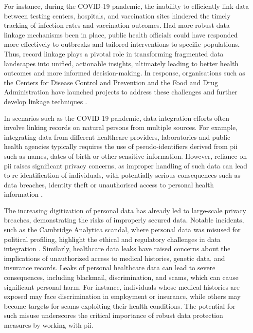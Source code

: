 For instance, during the COVID-19 pandemic, the inability to efficiently link data between testing centers, hospitals, and vaccination sites hindered the timely tracking of infection rates and vaccination outcomes. 
Had more robust data linkage mechanisms been in place, public health officials could have responded more effectively to outbreaks and tailored interventions to specific populations. 
Thus, record linkage plays a pivotal role in transforming fragmented data landscapes into unified, actionable insights, ultimately leading to better health outcomes and more informed decision-making.
In response, organisations such as the Centers for Disease Control and Prevention and the Food and Drug Administration have launched projects to address these challenges and further develop linkage techniques \cite{pathak2024privacy}.

In scenarios such as the COVID-19 pandemic, data integration efforts often involve linking records on natural persons from multiple sources.
For example, integrating data from different healthcare providers, laboratories and public health agencies typically requires the use of pseudo-identifiers derived from \ac{pii} such as names, dates of birth or other sensitive information. 
However, reliance on \ac{pii} raises significant privacy concerns, as improper handling of such data can lead to re-identification of individuals, with potentially serious consequences such as data breaches, identity theft or unauthorised access to personal health information \cite{pathak2024privacy}.

The increasing digitization of personal data has already led to large-scale privacy breaches, demonstrating the risks of improperly secured data. 
Notable incidents, such as the Cambridge Analytica scandal, where personal data was misused for political profiling, highlight the ethical and regulatory challenges in data integration \cite{isaak2018user}. 
Similarly, healthcare data leaks have raised concerns about the implications of unauthorized access to medical histories, genetic data, and insurance records.
Leaks of personal healthcare data can lead to severe consequences, including blackmail, discrimination, and scams, which can cause significant personal harm. 
For instance, individuals whose medical histories are exposed may face discrimination in employment or insurance, while others may become targets for scams exploiting their health conditions. 
The potential for such misuse underscores the critical importance of robust data protection measures by working with \ac{pii}.

